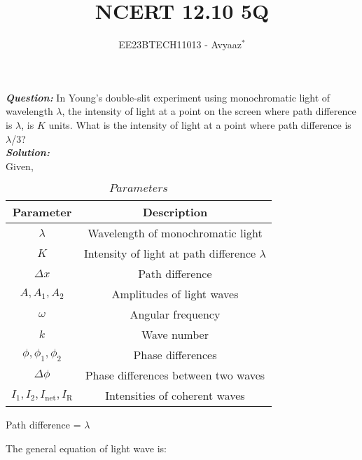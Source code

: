 \documentclass[journal,12pt,twocolumn]{IEEEtran}
\theoremstyle{remark}
\begin{document}

\vspace{3cm}

\title{NCERT 12.10 5Q}
\author{EE23BTECH11013 - Avyaaz$^{*}$%
}
\maketitle
\newpage
\bigskip

\renewcommand{\thefigure}{\theenumi}
\renewcommand{\thetable}{\arabic{table}}

\large\textbf{\textsl{Question:}}
In Young’s double-slit experiment using monochromatic light of wavelength $\lambda$, the intensity of light at a point on the screen where path difference is $\lambda$, is $K$ units. What is the intensity of light at a
point where path difference is $\lambda$/3?\\
\large\textbf{\textsl{Solution:}}\\
Given,\\
\begin{table}[htbp]
\centering
\begin{tabular}{c|c}
\hline 
   \textbf{Parameter}  &\textbf{Description} \\
\hline
     $\lambda$ & Wavelength of monochromatic light\\
\hline
$K$ & Intensity of light at path difference $\lambda$ \\
\hline
$\Delta x$ & Path difference \\
\hline
$A,A_1,A_2$ & Amplitudes of light waves \\
\hline
$\omega$ & Angular frequency \\
\hline
$k$ & Wave number \\ 
\hline
$\phi, \phi_1,\phi_2$ & Phase differences \\
\hline
$\Delta \phi $ & Phase differences between two waves \\
\hline
$I_1,I_2,I_{\text{net}},I_{\text{R}}$ & Intensities of coherent waves \\
\hline
\end{tabular}
\vspace{0.2cm}

\caption{$Parameters$}
\label{tab:parameters}
\end{table}

\hspace*{1cm}Path difference = $\lambda$

The general equation of light wave is:

\vspace{0.2cm}
\end{document}
